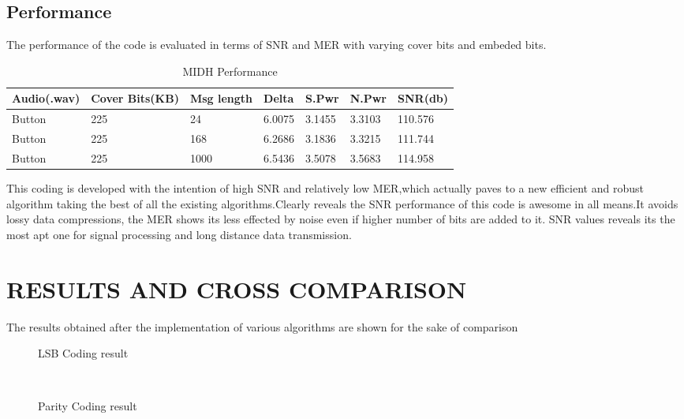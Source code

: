 \documentclass[a4paper, 12pt, notitlepage]{report}
\begin{document}
\section{Performance}

The performance of the code is evaluated in terms of SNR and MER with varying cover bits and embeded bits.
\begin{table}[h]
\begin{tabular}{|l|l|l|l|l|l|l|}
\hline
\textbf{ Audio(.wav)}&\textbf{Cover Bits(KB)}&\textbf{Msg length}&\textbf{Delta}&\textbf{S.Pwr}&\textbf{N.Pwr}&\textbf{SNR(db)} \\ \hline
 Button&225  &24  &6.0075  &3.1455 &3.3103 &110.576\\ \hline
 Button&225  &168  &6.2686  &3.1836 &3.3215 &111.744 \\ \hline
 Button&225  &1000  &6.5436  &3.5078 &3.5683 &114.958\\ \hline
\end{tabular}
\caption{MIDH Performance}
\end{table}

This coding is developed with the intention of high SNR and relatively low MER,which actually paves to a new efficient and robust algorithm taking the best of all the existing algorithms.Clearly reveals the SNR performance of this code is awesome in all means.It avoids lossy data compressions, the MER shows its less effected by noise even if higher number of bits are added to it. SNR values reveals its the most apt one for signal processing and long distance data transmission. 

\chapter{RESULTS AND CROSS COMPARISON}
The results obtained after the implementation of various algorithms are shown for the sake of comparison

\begin{figure}[h!]
{\par}
\caption{LSB Coding result}
\end{figure}\\

\begin{figure}[h!]
{\par}
\caption{Parity Coding result}
\end{figure}\\
\end{document}
